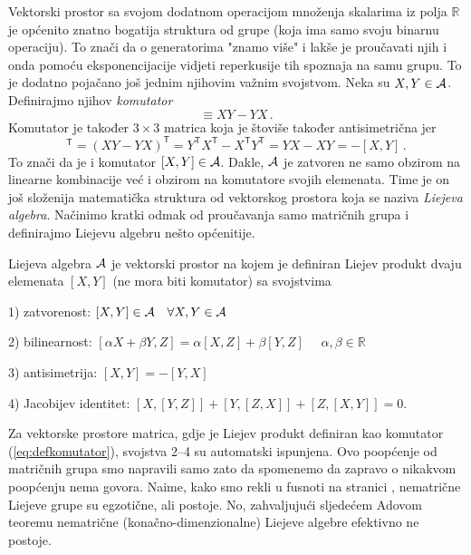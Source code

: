 Vektorski prostor sa svojom dodatnom operacijom množenja
skalarima iz polja $\mathbb{R}$ je općenito znatno bogatija struktura od grupe (koja
ima samo svoju binarnu operaciju). To znači da o generatorima "znamo više" i
lakše je proučavati njih i onda pomoću eksponencijacije vidjeti reperkusije tih
spoznaja na samu grupu. 
To je dodatno pojačano još jednim njihovim važnim svojstvom.
Neka su $X,Y\in\mathcal{A}$. Definirajmo njihov \emph{komutator}  
\begin{equation}
    [X, Y] \equiv X Y - Y X \,.
    \label{eq:defkomutator}
\end{equation}
Komutator je također $3\times 3$ matrica koja je štoviše također antisimetrična
jer
\begin{equation}
 [X,Y]^\mathsf{T} = (XY-YX)^\mathsf{T} = Y^\mathsf{T} X^\mathsf{T} - X^\mathsf{T} Y^\mathsf{T}
 = YX-XY = -[X,Y] \,.
\end{equation}
To znači da je i komutator $[X,Y]\in\mathcal{A}$.
Dakle, $\mathcal{A}$ je zatvoren ne samo obzirom na linearne kombinacije već
i obzirom na komutatore svojih elemenata. Time je on još složenija matematička
struktura od vektorskog prostora koja se naziva  \emph{Liejeva algebra}.
Načinimo kratki odmak od proučavanja samo matričnih grupa i
definirajmo Liejevu algebru nešto općenitije.
\begin{definicija} 
Liejeva algebra $\mathcal{A}$ je vektorski prostor na kojem je definiran 
Liejev produkt dvaju elemenata $[X,Y]$ (ne mora biti komutator) sa svojstvima

1) zatvorenost: $[X,Y]\in\mathcal{A} \quad \forall X,Y\in\mathcal{A}$

2) bilinearnost: $[\alpha X + \beta Y, Z]=\alpha[X,Z]+\beta[Y,Z]$
$\quad \alpha,\beta \in \mathbb{R} $

3) antisimetrija: $[X,Y]=-[Y,X]$

4) Jacobijev identitet: $[X, [Y, Z]]+[Y, [Z, X]]+[Z, [X, Y]]=0$.
\end{definicija}
Za vektorske prostore matrica, gdje je Liejev produkt definiran kao
komutator (\ref{eq:defkomutator}), svojstva 2--4 su automatski ispunjena.
Ovo poopćenje od matričnih grupa smo napravili samo zato da
spomenemo da zapravo o nikakvom poopćenju nema govora.
Naime, kako smo rekli u fusnoti na stranici \pageref{fus:nematricne}, nematrične Liejeve grupe
su egzotične, ali postoje. No, zahvaljujući sljedećem Adovom teoremu
nematrične (konačno-dimenzionalne) Liejeve algebre efektivno ne postoje.
